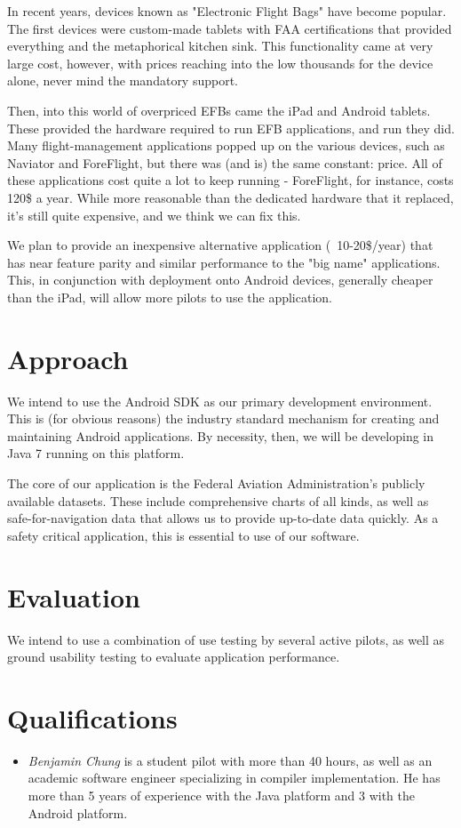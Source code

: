 \documentclass[10pt,a4paper]{report}
\begin{document}
In recent years, devices known as "Electronic Flight Bags" have become popular. The first devices were custom-made tablets with FAA certifications that provided everything and the metaphorical kitchen sink. This functionality came at very large cost, however, with prices reaching into the low thousands for the device alone, never mind the mandatory support.

Then, into this world of overpriced EFBs came the iPad and Android tablets. These provided the hardware required to run EFB applications, and run they did. Many flight-management applications popped up on the various devices, such as Naviator and ForeFlight, but there was (and is) the same constant: price. All of these applications cost quite a lot to keep running - ForeFlight, for instance, costs 120\$ a year. While more reasonable than the dedicated hardware that it replaced, it's still quite expensive, and we think we can fix this.

We plan to provide an inexpensive alternative application (~10-20\$/year) that has near feature parity and similar performance to the "big name" applications. This, in conjunction with deployment onto Android devices, generally cheaper than the iPad, will allow more pilots to use the application.

\section{Approach}
We intend to use the Android SDK as our primary development environment. This is (for obvious reasons) the industry standard mechanism for creating and maintaining Android applications. By necessity, then, we will be developing in Java 7 running on this platform. 

The core of our application is the Federal Aviation Administration's publicly available datasets. These include comprehensive charts of all kinds, as well as safe-for-navigation data that allows us to provide up-to-date data quickly. As a safety critical application, this is essential to use of our software.

\section{Evaluation}
We intend to use a combination of use testing by several active pilots, as well as ground usability testing to evaluate application performance. 

\section{Qualifications}
\begin{itemize}
\item \emph{Benjamin Chung} is a student pilot with more than 40 hours, as well as an academic software engineer specializing in compiler implementation. He has more than 5 years of experience with the Java platform and 3 with the Android platform.
\end{itemize}
\end{document}
